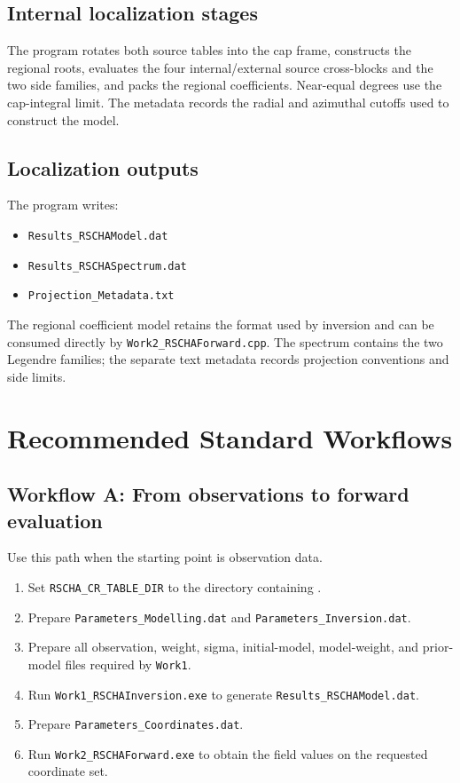 \documentclass[11pt,a4paper]{article}
\begin{document}
\subsection{Internal localization stages}

The program rotates both source tables into the cap frame, constructs the
regional roots, evaluates the four internal/external source cross-blocks
and the two side families, and packs the regional coefficients. Near-equal
degrees use the cap-integral limit. The metadata records the radial
and azimuthal cutoffs used to construct the model.

\subsection{Localization outputs}

The program writes:
\begin{itemize}
  \item \texttt{Results\_RSCHAModel.dat}
  \item \texttt{Results\_RSCHASpectrum.dat}
  \item \texttt{Projection\_Metadata.txt}
\end{itemize}

The regional coefficient model retains the format used by inversion and can be consumed directly by \texttt{Work2\_RSCHAForward.cpp}. The spectrum contains the two Legendre families; the separate text metadata records projection conventions and side limits.

\section{Recommended Standard Workflows}

\subsection{Workflow A: From observations to forward evaluation}

Use this path when the starting point is observation data.

\begin{enumerate}
  \item Set \texttt{RSCHA\_CR\_TABLE\_DIR} to the directory containing .
  \item Prepare \texttt{Parameters\_Modelling.dat} and \texttt{Parameters\_Inversion.dat}.
  \item Prepare all observation, weight, sigma, initial-model, model-weight, and prior-model files required by \texttt{Work1}.
  \item Run \texttt{Work1\_RSCHAInversion.exe} to generate \texttt{Results\_RSCHAModel.dat}.
  \item Prepare \texttt{Parameters\_Coordinates.dat}.
  \item Run \texttt{Work2\_RSCHAForward.exe} to obtain the field values on the requested coordinate set.
\end{enumerate}
\end{document}
